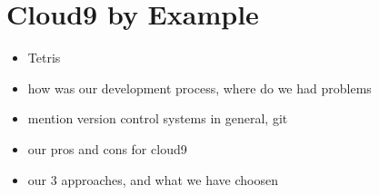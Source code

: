 \section{Cloud9 by Example}
\label{sec:Motivation}

\begin{itemize}
	\item Tetris
	\item how was our development process, where do we had problems	
	\item mention version control systems in general, git
	\item our pros and cons for cloud9
	\item our 3 approaches, and what we have choosen
\end{itemize}